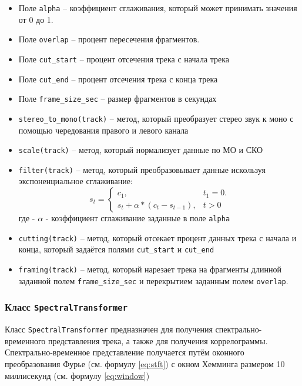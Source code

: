 \begin{itemize}
\item{Поле \texttt{alpha} -- коэффициент сглаживания, который может принимать значения от 0 до 1.}
\item{Поле \texttt{overlap} -- процент пересечения фрагментов.}
\item{Поле \texttt{cut\_start} -- процент отсечения трека с начала трека}
\item{Поле \texttt{cut\_end} -- процент отсечения трека с конца трека}
\item{Поле \texttt{frame\_size\_sec} -- размер фрагментов в секундах}
\item{\texttt{stereo\_to\_mono(track)} -- метод, который преобразует стерео звук к моно с помощью чередования правого и левого канала}
\item{\texttt{scale(track)} -- метод, который нормализует данные по МО и СКО}
\item{\texttt{filter(track)} -- метод, который преобразовывает данные искользуя экспоненциальное сглаживание:
\begin{equation}\label{eq:sfm}
s_t = \begin{cases} 
c_1, & t_1 = 0. \\
s_{t} + \alpha * (c_t - s_{t-1}), & t > 0
\end{cases} 
\end{equation}
где - $\alpha$ - коэффициент сглаживание заданные в поле \texttt{alpha}}
\item{\texttt{cutting(track)} -- метод, который отсекает процент данных трека с начала и конца, который задаётся полями \texttt{cut\_start} и \texttt{cut\_end}}
\item{\texttt{framing(track)} -- метод, который нарезает трека на фрагменты длинной заданной полем \texttt{frame\_size\_sec} и перекрытием заданным полем \texttt{overlap}.}
\end{itemize}


\subsubsection{Класс \texttt{SpectralTransformer}}

Класс \texttt{SpectralTransformer} предназначен для получения спектрально-временного представления трека, а также для получения коррелограммы. Спектрально-временное представление получается путём оконного преобразования Фурье (см. формулу \ref{eq:stft}) с окном Хемминга размером 10 миллисекунд (см. формулу \ref{eq:window})

